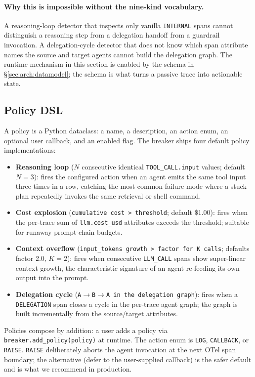 \documentclass[sigplan,10pt,anonymous,review]{acmart}
\begin{document}
\paragraph{Why this is impossible without the nine-kind vocabulary.}
A reasoning-loop detector that inspects only vanilla
\texttt{INTERNAL} spans cannot distinguish a reasoning step from a
delegation handoff from a guardrail invocation. A delegation-cycle
detector that does not know which span attribute names the source and
target agents cannot build the delegation graph. The runtime mechanism
in this section is enabled by the schema in
\S\ref{sec:arch:datamodel}; the schema is what turns a passive trace
into actionable state.

\subsection{Policy DSL}

A policy is a Python dataclass: a name, a description, an action enum,
an optional user callback, and an enabled flag. The breaker ships four
default policy implementations:

\begin{itemize}
\item \textbf{Reasoning loop} ($N$ consecutive identical
\texttt{TOOL\_CALL.input} values; default $N=3$): fires the configured
action when an agent emits the same tool input three times in a row,
catching the most common failure mode where a stuck plan repeatedly
invokes the same retrieval or shell command.
\item \textbf{Cost explosion} (\texttt{cumulative cost > threshold};
default \$1.00): fires when the per-trace sum of
\texttt{llm.cost\_usd} attributes exceeds the threshold; suitable for
runaway prompt-chain budgets.
\item \textbf{Context overflow} (\texttt{input\_tokens growth > factor
for K calls}; defaults factor 2.0, $K=2$): fires when consecutive
\texttt{LLM\_CALL} spans show super-linear context growth, the
characteristic signature of an agent re-feeding its own output into the
prompt.
\item \textbf{Delegation cycle}
(\texttt{A$\to$B$\to$A in the delegation graph}): fires when a
\texttt{DELEGATION} span closes a cycle in the per-trace agent graph;
the graph is built incrementally from the source/target attributes.
\end{itemize}

Policies compose by addition: a user adds a policy via
\texttt{breaker.add\_policy(policy)} at runtime. The action enum is
\texttt{LOG}, \texttt{CALLBACK}, or \texttt{RAISE}. \texttt{RAISE}
deliberately aborts the agent invocation at the next OTel span
boundary; the alternative (defer to the user-supplied callback) is the
safer default and is what we recommend in production.
\end{document}
